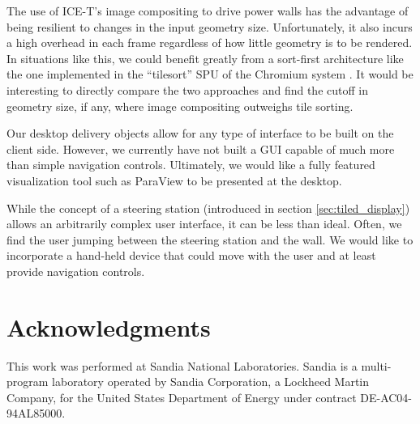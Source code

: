 \documentclass[twocolumn]{article}
\begin{document}
  The use of ICE-T's image compositing to drive power walls has the
  advantage of being resilient to changes in the input geometry size.
  Unfortunately, it also incurs a high overhead in each frame regardless of
  how little geometry is to be rendered.  In situations like this, we could
  benefit greatly from a sort-first architecture like the one implemented
  in the ``tilesort'' SPU of the Chromium system \cite{Humphreys02}.  It
  would be interesting to directly compare the two approaches and find the
  cutoff in geometry size, if any, where image compositing outweighs tile
  sorting.

  Our desktop delivery objects allow for any type of interface to be built
  on the client side.  However, we currently have not built a GUI capable
  of much more than simple navigation controls.  Ultimately, we would like
  a fully featured visualization tool such as ParaView \cite{Law01} to be
  presented at the desktop.

  While the concept of a steering station (introduced in section
  \ref{sec:tiled_display}) allows an arbitrarily complex user interface, it
  can be less than ideal.  Often, we find the user jumping between the
  steering station and the wall.  We would like to incorporate a hand-held
  device that could move with the user and at least provide navigation
  controls.


  \section{Acknowledgments}

  This work was performed at Sandia National Laboratories.  Sandia is a
  multi-program laboratory operated by Sandia Corporation, a Lockheed
  Martin Company, for the United States Department of Energy under contract
  DE-AC04-94AL85000.


  
  
\end{document}
